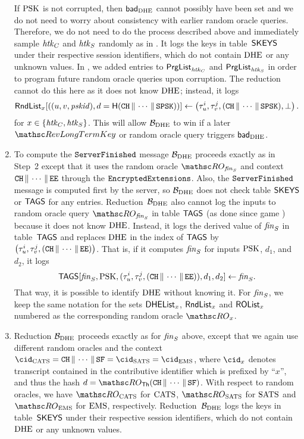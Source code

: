 \begin{enumerate}
		If $\mathrm{PSK}$ is not corrupted, then $\mathsf{bad}_{\mathrm{DHE}}$ cannot possibly have been set and we do not need to worry about consistency with earlier random oracle queries.
		Therefore, we do not need to do the process described above and immediately sample $\mathit{htk}_C$ and $\mathit{htk}_S$ randomly as in \thisGame.
		It logs the keys in table~$\mathsf{SKEYS}$ under their respective session identifiers, which do not contain $\mathrm{DHE}$ or any unknown values.
		In \thisGame, we added entries to $\mathsf{PrgList}_{\mathit{htk}_C}$ and $\mathsf{PrgList}_{\mathit{htk}_S}$ in order to program future random oracle queries upon corruption.
		The reduction cannot do this here as it does not know $\mathrm{DHE}$; instead, it logs
		\[
		\mathsf{RndList}_x[((u, v, \mathit{pskid}), d = \mathsf{H}(\mathtt{CH} {\,\|\,} \dotsb {\,\|\,} \mathtt{SPSK}) )] \gets \left(  \tau_u^i, \tau_v^j, (\mathtt{CH} {\,\|\,} \dotsb {\,\|\,} \mathtt{SPSK}), \bot \right).
		\]
		for $x \in \{\mathit{htk}_C, \mathit{htk}_S\}$.
		This will allow $\mathcal{B}_{\mathrm{DHE}}$ to win if a later $\RevLongTermKey$ or random oracle query triggers $\mathsf{bad}_{\mathrm{DHE}}$.
		\item To compute the $\mathtt{ServerFinished}$ message $\mathcal{B}_{\mathrm{DHE}}$ proceeds exactly as in Step~2 except that it uses the random oracle $\RO_{\sfin}$ and context $\mathtt{CH} {\,\|\,} \dotsb {\,\|\,} \mathtt{EE}$ through the $\mathtt{EncryptedExtensions}$. 
		Also, the $\mathtt{ServerFinished}$ message is computed first by the server, so $\mathcal{B}_{\mathrm{DHE}}$ does not check table $\mathsf{SKEYS}$ or $\mathsf{TAGS}$ for any entries.
		Reduction~$\mathcal{B}_{\mathrm{DHE}}$ also cannot log the inputs to random oracle query $\RO_{\sfin}$ in table $\mathsf{TAGS}$ (as done since game ) because it does not know $\mathrm{DHE}$.
		Instead, it logs the derived value of $\mathit{fin}_S$ in table~$\mathsf{TAGS}$ and replaces $\mathrm{DHE}$ in the index of $\mathsf{TAGS}$ by $\left(  \tau_u^i, \tau_v^j, (\mathtt{CH} {\,\|\,} \dotsb {\,\|\,} \mathtt{EE}) \right)$.
		That is, if it computes $\mathit{fin}_S$ for inputs $\mathrm{PSK}$, $d_1$, and $d_2$, it logs
			\[
			\mathsf{TAGS}[ \mathit{fin}_S, \mathrm{PSK}, (\tau_u^i, \tau_v^j, (\mathtt{CH} {\,\|\,} \dotsb {\,\|\,} \mathtt{EE})), d_1, d_2 ] \gets \mathit{fin}_S.
			\]
			That way, it is possible to identify $\mathrm{DHE}$ without knowing it.
		For $\mathit{fin}_S$, we keep the same notation for the sets $\mathsf{DHEList}_x$, $\mathsf{RndList}_x$ and $\mathsf{ROList}_x$ numbered as the corresponding random oracle $\RO_x$.
		\item Reduction $\mathcal{B}_{\mathrm{DHE}}$ proceeds exactly as for $\mathit{fin}_S$ above,
		except that we again use different random oracles and the context $\cid_\cats = \CH \concat \dotsb \concat \SF = \cid_\sats = \cid_\ems$, where $\cid_x$ denotes transcript contained in the contributive identifier which is prefixed by ``$x$'', and thus the hash $d = \RO_\Thash(\CH \concat \dotsb \concat \SF)$.
		With respect to random oracles, we have $\RO_{\cats}$ for $\mathrm{CATS}$, $\RO_{\sats}$ for $\mathrm{SATS}$ and $\RO_{\ems}$ for $\mathrm{EMS}$, respectively.
		Reduction~$\mathcal{B}_{\mathrm{DHE}}$ logs the keys in table~$\mathsf{SKEYS}$ under their respective session identifiers, which do not contain $\mathrm{DHE}$ or any unknown values.
		

\end{enumerate}
